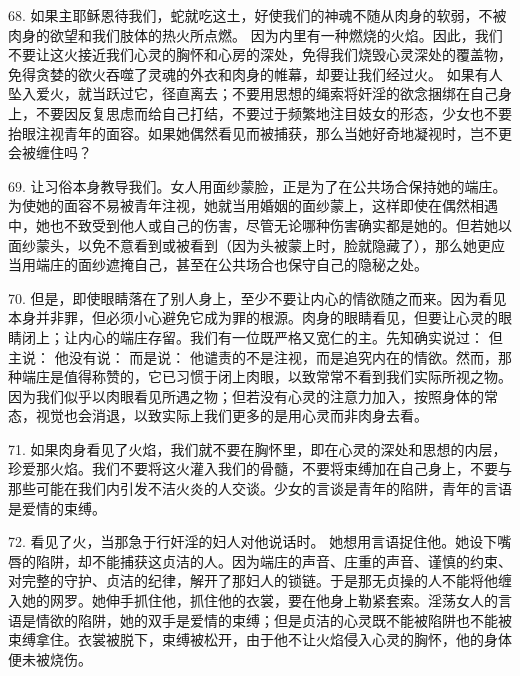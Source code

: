 68. 如果主耶稣恩待我们，蛇就吃这土，好使我们的神魂不随从肉身的软弱，不被肉身的欲望和我们肢体的热火所点燃。 因为内里有一种燃烧的火焰。因此，我们不要让这火接近我们心灵的胸怀和心房的深处，免得我们烧毁心灵深处的覆盖物，免得贪婪的欲火吞噬了灵魂的外衣和肉身的帷幕，却要让我们经过火。 如果有人坠入爱火，就当跃过它，径直离去；不要用思想的绳索将奸淫的欲念捆绑在自己身上，不要因反复思虑而给自己打结，不要过于频繁地注目妓女的形态，少女也不要抬眼注视青年的面容。如果她偶然看见而被捕获，那么当她好奇地凝视时，岂不更会被缠住吗？\par

69. 让习俗本身教导我们。女人用面纱蒙脸，正是为了在公共场合保持她的端庄。为使她的面容不易被青年注视，她就当用婚姻的面纱蒙上，这样即使在偶然相遇中，她也不致受到他人或自己的伤害，尽管无论哪种伤害确实都是她的。但若她以面纱蒙头，以免不意看到或被看到（因为头被蒙上时，脸就隐藏了），那么她更应当用端庄的面纱遮掩自己，甚至在公共场合也保守自己的隐秘之处。\par

70. 但是，即使眼睛落在了别人身上，至少不要让内心的情欲随之而来。因为看见本身并非罪，但必须小心避免它成为罪的根源。肉身的眼睛看见，但要让心灵的眼睛闭上；让内心的端庄存留。我们有一位既严格又宽仁的主。先知确实说过： 但主说：  他没有说： 而是说： 他谴责的不是注视，而是追究内在的情欲。然而，那种端庄是值得称赞的，它已习惯于闭上肉眼，以致常常不看到我们实际所视之物。因为我们似乎以肉眼看见所遇之物；但若没有心灵的注意力加入，按照身体的常态，视觉也会消退，以致实际上我们更多的是用心灵而非肉身去看。\par

71. 如果肉身看见了火焰，我们就不要在胸怀里，即在心灵的深处和思想的内层，珍爱那火焰。我们不要将这火灌入我们的骨髓，不要将束缚加在自己身上，不要与那些可能在我们内引发不洁火炎的人交谈。少女的言谈是青年的陷阱，青年的言语是爱情的束缚。\par

72. 看见了火，当那急于行奸淫的妇人对他说话时。 她想用言语捉住他。她设下嘴唇的陷阱，却不能捕获这贞洁的人。因为端庄的声音、庄重的声音、谨慎的约束、对完整的守护、贞洁的纪律，解开了那妇人的锁链。于是那无贞操的人不能将他缠入她的网罗。她伸手抓住他，抓住他的衣裳，要在他身上勒紧套索。淫荡女人的言语是情欲的陷阱，她的双手是爱情的束缚；但是贞洁的心灵既不能被陷阱也不能被束缚拿住。衣裳被脱下，束缚被松开，由于他不让火焰侵入心灵的胸怀，他的身体便未被烧伤。\par

